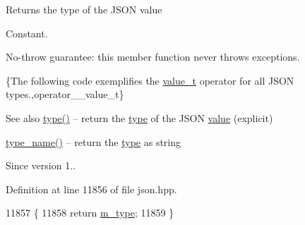 \begin{DoxyReturn}{Returns}
the type of the J\+S\+ON value
\end{DoxyReturn}
Constant.

No-\/throw guarantee\+: this member function never throws exceptions.

\{The following code exemplifies the \hyperlink{classnlohmann_1_1basic__json_ae8cbef097f7da18a781fc86587de6b90}{value\+\_\+t} operator for all J\+S\+ON types.,operator\+\_\+\+\_\+value\+\_\+t\}

\begin{DoxySeeAlso}{See also}
\hyperlink{classnlohmann_1_1basic__json_a2b2d781d7f2a4ee41bc0016e931cadf7}{type()} -- return the \hyperlink{classnlohmann_1_1basic__json_a2b2d781d7f2a4ee41bc0016e931cadf7}{type} of the J\+S\+ON \hyperlink{classnlohmann_1_1basic__json_adcf8ca5079f5db993820bf50036bf45d}{value} (explicit) 

\hyperlink{classnlohmann_1_1basic__json_a9d0a478571f82f0163b96b2424cd998f}{type\+\_\+name()} -- return the \hyperlink{classnlohmann_1_1basic__json_a2b2d781d7f2a4ee41bc0016e931cadf7}{type} as string
\end{DoxySeeAlso}
\begin{DoxySince}{Since}
version 1.. 
\end{DoxySince}


Definition at line 11856 of file json.\+hpp.


\begin{DoxyCode}
11857     \{
11858         \textcolor{keywordflow}{return} \hyperlink{classnlohmann_1_1basic__json_a91990b60d7d4d67968a2c1db677536e7}{m\_type};
11859     \}
\end{DoxyCode}
\mbox{\label{classnlohmann_1_1basic__json_a1f1d4bc973c5b866db3d96e14d2c9f3f}} 
